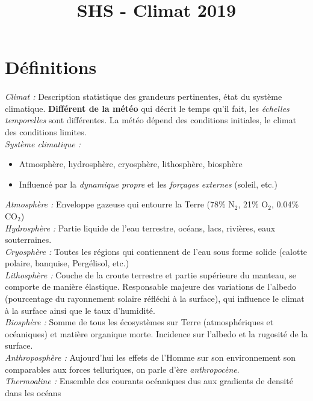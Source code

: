 \documentclass {article}
\title{SHS - Climat 2019}
\date{\vspace{-5ex}}
\newcommand{\V}[0]{\vspace{1\baselineskip}}
\begin{document}
\maketitle
\bigskip

\section{Définitions}
\paragraph{}
\textit{Climat :} Description statistique des grandeurs pertinentes, état du système climatique.
\textbf{Différent de la météo} qui décrit le temps qu'il fait, les \emph{échelles temporelles} sont différentes. La météo dépend des conditions initiales, le climat des conditions limites.
\vspace{1\baselineskip}
\\
\textit{Système climatique :} 
\begin{itemize}
\item Atmosphère, hydrosphère, cryosphère, lithosphère, biosphère
\item Influencé par la \emph{dynamique propre} et les \emph{forçages externes} (soleil, etc.)
\end{itemize}
\vspace{1\baselineskip}
\textit{Atmosphère :} Enveloppe gazeuse qui entourre la Terre (78\% N$_2$, 21\% O$_2$, 0.04\% CO$_2$)
\V
\\
\textit{Hydrosphère :} Partie liquide de l'eau terrestre, océans, lacs, rivières, eaux souterraines.
\V
\\
\textit{Cryosphère :} Toutes les régions qui contiennent de l'eau sous forme solide (calotte polaire, banquise, Pergélisol, etc.)
\V
\\
\textit{Lithosphère : } Couche de la croute terrestre et partie supérieure du manteau, se comporte de manière élastique. Responsable majeure des variations de l'albedo (pourcentage du rayonnement solaire réfléchi à la surface), qui influence le climat à la surface ainsi que le taux d'humidité.
\V
\\
\textit{Biosphère :} Somme de tous les écosystèmes sur Terre (atmosphériques et océaniques) et matière organique morte. Incidence sur l'albedo et la rugosité de la surface.
\V
\\
\textit{Anthroposphère :} Aujourd'hui les effets de l'Homme sur son environnement son comparables aux forces telluriques, on parle d'ère \emph{anthropocène}.
\V
\\
\textit{Thermoaline :} Ensemble des courants océaniques dus aux gradients de densité dans les océans
\end{document}

